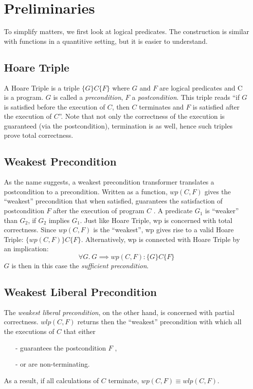\documentclass[adraft,hidelinks]{eptcs}
\begin{document}
\section{Preliminaries}
To simplify matters, we first look at logical predicates. 
The construction is similar with functions in a quantitive setting, but it is easier to understand.

\subsection{Hoare Triple}
A Hoare Triple is a triple $ \{G\} C \{F\}$ where $G$ and $F$ are logical predicates and C is a program. 
$G$ is called a \textit{precondition}, $F$ a \textit{postcondition}. 
This triple reads ``if $G$ is satisfied before the execution of $C$, then $C$ terminates and $F$ is satisfied after the execution of $C$''. 
Note that not only the correctness of the execution is guaranteed (via the postcondition), termination is as well, hence such triples prove total correctness. 

\subsection{Weakest Precondition}
As the name suggests, a weakest precondition transformer translates a postcondition to a precondition. 
Written as a function, $wp(C,F)$ gives the ``weakest'' precondition that when satisfied, guarantees the satisfaction of postcondition $F$ after the execution of program $C$ . 
A predicate $G_1$ is ``weaker'' than $G_2$, if $G_2$ implies $G_1$. 
Just like Hoare Triple, wp is concerned with total correctness. 
Since $wp(C,F)$ is the ``weakest'', wp gives rise to a valid Hoare Triple: $\{wp(C,F)\} C \{F\}$. 
Alternatively, wp is connected with Hoare Triple by an implication: 
\[\forall G.\ G\implies wp(C,F): \{G\} C \{F\}\]
$G$ is then in this case the \textit{sufficient precondition}. 

\subsection{Weakest Liberal Precondition}
The \textit{weakest liberal precondition}, on the other hand, is concerned with partial correctness. 
$wlp(C,F)$ returns then the ``weakest'' precondition with which all the executions of $C$ that either
\begin{itemize}
    \item[-] guarantees the postcondition $F$ , 
    \item[-] or are non-terminating. 
\end{itemize}
As a result, if all calculations of $C$ terminate, $wp(C,F)\equiv wlp(C,F)$. 
\end{document}
